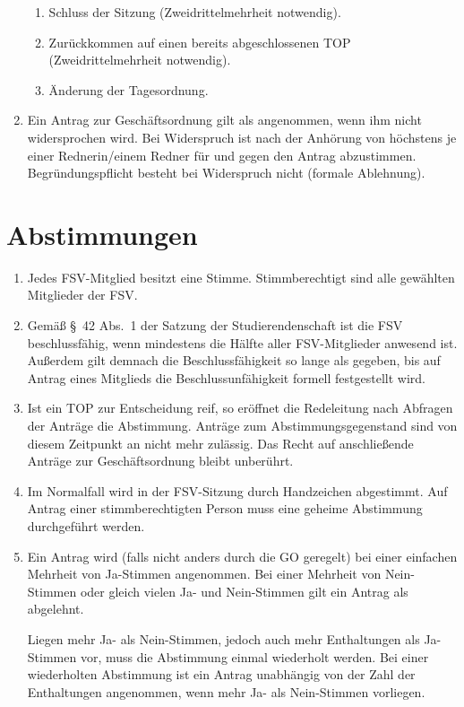 \documentclass[
	a4paper,
	12pt,
	oneside,
	parskip=half-,
	pagesize,
	headsepline,
	german,
	ngerman
]{scrartcl}
\begin{document}
\begin{enumerate}
\begin{enumerate}
		\item Schluss der Sitzung (Zweidrittelmehrheit notwendig).
		\item Zurückkommen auf einen bereits abgeschlossenen TOP (Zweidrittelmehrheit notwendig).
		\item Änderung der Tagesordnung.
	\end{enumerate}
	\item Ein Antrag zur Geschäftsordnung gilt als angenommen, wenn ihm nicht widersprochen wird. Bei Widerspruch ist nach der Anhörung von höchstens je einer Rednerin/einem Redner für und gegen den Antrag abzustimmen. Begründungspflicht besteht bei Widerspruch nicht (formale Ablehnung).
\end{enumerate}

\section{Abstimmungen}
\label{sec:abstimmungen}
\begin{enumerate}
	\item Jedes FSV-Mitglied besitzt eine Stimme. Stimmberechtigt sind alle gewählten Mitglieder der FSV.
	\item Gemäß §~42 Abs.~1 der Satzung der Studierendenschaft ist die FSV beschlussfähig, wenn mindestens die Hälfte aller FSV-Mitglieder anwesend ist. Außerdem gilt demnach die Beschlussfähigkeit so lange als gegeben, bis auf Antrag eines Mitglieds die Beschlussunfähigkeit formell festgestellt wird.
	\item Ist ein TOP zur Entscheidung reif, so eröffnet die Redeleitung nach Abfragen der Anträge die Abstimmung. Anträge zum Abstimmungsgegenstand sind von diesem Zeitpunkt an nicht mehr zulässig. Das Recht auf anschließende Anträge zur Geschäftsordnung bleibt unberührt.
	\item Im Normalfall wird in der FSV-Sitzung durch Handzeichen abgestimmt. Auf Antrag einer stimmberechtigten Person muss eine geheime Abstimmung durchgeführt werden.
	\item Ein Antrag wird (falls nicht anders durch die GO geregelt) bei einer einfachen Mehrheit von Ja-Stimmen angenommen. Bei einer Mehrheit von Nein-Stimmen oder gleich vielen Ja- und Nein-Stimmen gilt ein Antrag als abgelehnt.
	
	Liegen mehr Ja- als Nein-Stimmen, jedoch auch mehr Enthaltungen als Ja-Stimmen vor, muss die Abstimmung einmal wiederholt werden. Bei einer wiederholten Abstimmung ist ein Antrag unabhängig von der Zahl der Enthaltungen angenommen, wenn mehr Ja- als Nein-Stimmen vorliegen.
\end{enumerate}
\end{document}
